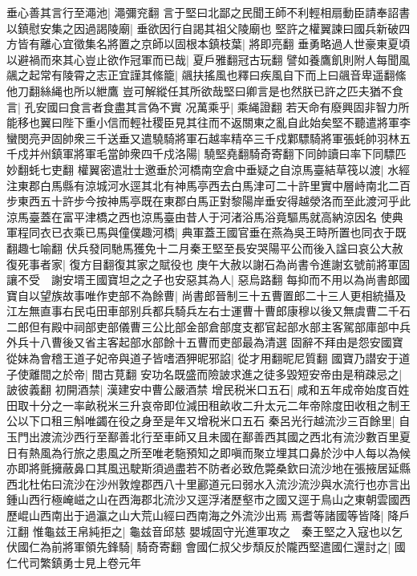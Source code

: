 垂心善其言行至澠池|{
	澠彌兖翻}
言于堅曰北鄙之民聞王師不利輕相扇動臣請奉詔書以鎮慰安集之因過謁陵廟|{
	垂欲因行自謁其祖父陵廟也}
堅許之權翼諫曰國兵新破四方皆有離心宜徵集名將置之京師以固根本鎮枝葉|{
	將即亮翻}
垂勇略過人世豪東夏頃以避禍而來其心豈止欲作冠軍而已哉|{
	夏戶雅翻冠古玩翻}
譬如養鷹飢則附人每聞風飊之起常有陵霄之志正宜謹其絛籠|{
	飊扶搖風也釋曰疾風自下而上曰飊音卑遥翻絛他刀翻絲䋲也所以紲鷹}
豈可解縱任其所欲哉堅曰卿言是也然朕已許之匹夫猶不食言|{
	孔安國曰食言者食盡其言偽不實}
况萬乘乎|{
	乘䋲證翻}
若天命有廢興固非智力所能移也翼曰陛下重小信而輕社稷臣見其往而不返關東之亂自此始矣堅不聽遣將軍李蠻閔亮尹固帥衆三千送垂又遣驍騎將軍石越率精卒三千戍鄴驃騎將軍張蚝帥羽林五千戍并州鎮軍將軍毛當帥衆四千戍洛陽|{
	驍堅堯翻騎奇寄翻下同帥讀曰率下同驃匹妙翻蚝七吏翻}
權翼密遣壯士邀垂於河橋南空倉中垂疑之自涼馬臺結草筏以渡|{
	水經注東郡白馬縣有涼城河水逕其北有神馬亭西去白馬津可二十許里實中層峙南北二百步東西五十許步今按神馬亭既在東郡白馬正對黎陽岸垂安得越滎洛而至此渡河乎此涼馬臺蓋在富平津橋之西也涼馬臺由昔人于河渚浴馬浴竟驅馬就高納涼因名}
使典軍程同衣已衣乘已馬與僮僕趣河橋|{
	典軍蓋王國官垂在燕為吳王時所置也同衣于既翻趣七喻翻}
伏兵發同馳馬獲免十二月秦王堅至長安哭陽平公而後入諡曰哀公大赦復死事者家|{
	復方目翻復其家之賦役也}
庚午大赦以謝石為尚書令進謝玄號前將軍固讓不受　謝安壻王國寶坦之之子也安惡其為人|{
	惡烏路翻}
每抑而不用以為尚書郎國寶自以望族故事唯作吏部不為餘曹|{
	尚書郎晉制三十五曹置郎二十三人更相統攝及江左無直事右民屯田車部别兵都兵騎兵左右士運曹十曹郎康穆以後又無虞曹二千石二郎但有殿中祠部吏部儀曹三公比部金部倉部度支都官起部水部主客駕部庫部中兵外兵十八曹後又省主客起部水部餘十五曹而吏部最為清選}
固辭不拜由是怨安國寶從妹為會稽王道子妃帝與道子皆嗜酒狎昵邪諂|{
	從才用翻昵尼質翻}
國寶乃譛安于道子使離間之於帝|{
	間古莧翻}
安功名既盛而險詖求進之徒多毀短安帝由是稍疎忌之|{
	詖彼義翻}
初開酒禁|{
	漢建安中曹公嚴酒禁}
增民税米口五石|{
	咸和五年成帝始度百姓田取十分之一率畝税米三升哀帝即位減田租畝收二升太元二年帝除度田收租之制王公以下口租三斛唯蠲在役之身至是年又增税米口五石}
秦呂光行越流沙三百餘里|{
	自玉門出渡流沙西行至鄯善北行至車師又且未國在鄯善西其國之西北有流沙數百里夏日有熱風為行旅之患風之所至唯老駞預知之即嗔而聚立埋其口鼻於沙中人每以為候亦即將氈擁蔽鼻口其風迅駛斯須過盡若不防者必致危斃桑欽曰流沙地在張掖居延縣西北杜佑曰流沙在沙州敦煌郡西八十里酈道元曰弱水入流沙流沙與水流行也亦言出鍾山西行極崦嵫之山在西海郡北流沙又逕浮渚歷壑市之國又逕于鳥山之東朝雲國西歷崐山西南出于過瀛之山大荒山經曰西南海之外流沙出焉}
焉耆等諸國等皆降|{
	降戶江翻}
惟龜兹王帛純拒之|{
	龜兹音邱慈}
嬰城固守光進軍攻之　秦王堅之入寇也以乞伏國仁為前將軍領先鋒騎|{
	騎奇寄翻}
會國仁叔父步頹反於隴西堅遣國仁還討之|{
	國仁代司繁鎮勇士見上卷元年}

